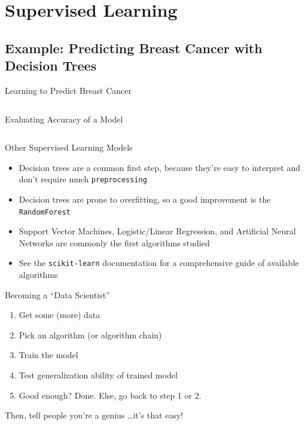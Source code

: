 \documentclass{lug}
\begin{document}
\section{Supervised Learning}
\subsection{Example: Predicting Breast Cancer with Decision Trees}
\begin{frame}{Learning to Predict Breast Cancer}
\inputminted{python3}{examples/cancer-dt.py}
\end{frame}

\begin{frame}{Evaluating Accuracy of a Model}
\inputminted{python3}{examples/cancer-dt2.py}
\end{frame}

\begin{frame}{Other Supervised Learning Models}
  \begin{itemize}[<+->]
    \item Decision trees are a common first step, because they're easy to interpret and don't require much \texttt{preprocessing}
    \item Decision trees are prone to overfitting, so a good improvement is the \texttt{RandomForest}
    \item Support Vector Machines, Logistic/Linear Regression, and Artificial Neural Networks are commonly the first algorithms studied
    \item See the \texttt{scikit-learn} documentation for a comprehensive guide of available algorithms
  \end{itemize}
\end{frame}

\begin{frame}{Becoming a ``Data Scientist''}
  \begin{enumerate}
    \item Get some (more) data
    \item Pick an algorithm (or algorithm chain)
    \item Train the model
    \item Test generalization ability of trained model
    \item Good enough? Done. Else, go back to step 1 or 2.
  \end{enumerate}
  \begin{center}
  Then, tell people you're a genius \dots it's that easy!
  \end{center}
\end{frame}
\end{document}

